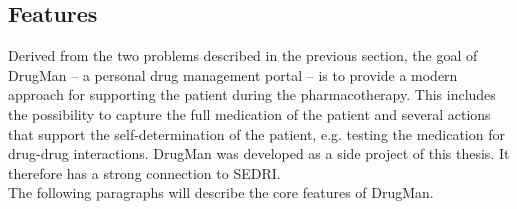 

\subsection{Features}
\label{sec:features}

Derived from the two problems described in the previous section, the goal of DrugMan -- a personal drug management portal -- is to provide a modern approach for supporting the patient during the pharmacotherapy.
This includes the possibility to capture the full medication of the patient and several actions that support the self-determination of the patient, e.g. testing the medication for drug-drug interactions.
DrugMan was developed as a side project of this thesis.
It therefore has a strong connection to SEDRI.\\
The following paragraphs will describe the core features of DrugMan.

